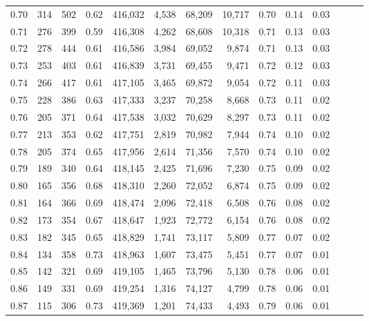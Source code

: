 \begin{tabular}{rrrrrrrrrrrrrr}
0.70 &     314 &    502 &  0.62 &  416,032 &    4,538 &  68,209 &  10,717 &  0.70 &  0.14 &      0.03 \\
0.71 &     276 &    399 &  0.59 &  416,308 &    4,262 &  68,608 &  10,318 &  0.71 &  0.13 &      0.03 \\
0.72 &     278 &    444 &  0.61 &  416,586 &    3,984 &  69,052 &   9,874 &  0.71 &  0.13 &      0.03 \\
0.73 &     253 &    403 &  0.61 &  416,839 &    3,731 &  69,455 &   9,471 &  0.72 &  0.12 &      0.03 \\
0.74 &     266 &    417 &  0.61 &  417,105 &    3,465 &  69,872 &   9,054 &  0.72 &  0.11 &      0.03 \\
0.75 &     228 &    386 &  0.63 &  417,333 &    3,237 &  70,258 &   8,668 &  0.73 &  0.11 &      0.02 \\
0.76 &     205 &    371 &  0.64 &  417,538 &    3,032 &  70,629 &   8,297 &  0.73 &  0.11 &      0.02 \\
0.77 &     213 &    353 &  0.62 &  417,751 &    2,819 &  70,982 &   7,944 &  0.74 &  0.10 &      0.02 \\
0.78 &     205 &    374 &  0.65 &  417,956 &    2,614 &  71,356 &   7,570 &  0.74 &  0.10 &      0.02 \\
0.79 &     189 &    340 &  0.64 &  418,145 &    2,425 &  71,696 &   7,230 &  0.75 &  0.09 &      0.02 \\
0.80 &     165 &    356 &  0.68 &  418,310 &    2,260 &  72,052 &   6,874 &  0.75 &  0.09 &      0.02 \\
0.81 &     164 &    366 &  0.69 &  418,474 &    2,096 &  72,418 &   6,508 &  0.76 &  0.08 &      0.02 \\
0.82 &     173 &    354 &  0.67 &  418,647 &    1,923 &  72,772 &   6,154 &  0.76 &  0.08 &      0.02 \\
0.83 &     182 &    345 &  0.65 &  418,829 &    1,741 &  73,117 &   5,809 &  0.77 &  0.07 &      0.02 \\
0.84 &     134 &    358 &  0.73 &  418,963 &    1,607 &  73,475 &   5,451 &  0.77 &  0.07 &      0.01 \\
0.85 &     142 &    321 &  0.69 &  419,105 &    1,465 &  73,796 &   5,130 &  0.78 &  0.06 &      0.01 \\
0.86 &     149 &    331 &  0.69 &  419,254 &    1,316 &  74,127 &   4,799 &  0.78 &  0.06 &      0.01 \\
0.87 &     115 &    306 &  0.73 &  419,369 &    1,201 &  74,433 &   4,493 &  0.79 &  0.06 &      0.01 \\

\end{tabular}
